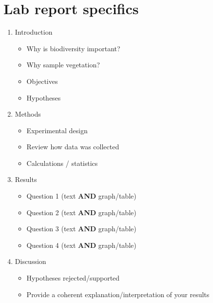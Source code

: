 \documentclass[]{book}
\providecommand{\tightlist}{%
  \setlength{\itemsep}{0pt}\setlength{\parskip}{0pt}}
\theoremstyle{definition}
\theoremstyle{definition}
\theoremstyle{definition}
\theoremstyle{remark}
\begin{document}
\pagebreak

\section{Lab report specifics}\label{lab-report-specifics-2}

\begin{enumerate}
\def\labelenumi{\arabic{enumi}.}
\tightlist
\item
  Introduction

  \begin{itemize}
  \tightlist
  \item
    Why is biodiversity important?
  \item
    Why sample vegetation?
  \item
    Objectives
  \item
    Hypotheses
  \end{itemize}
\item
  Methods

  \begin{itemize}
  \tightlist
  \item
    Experimental design
  \item
    Review how data was collected
  \item
    Calculations / statistics
  \end{itemize}
\item
  Results

  \begin{itemize}
  \tightlist
  \item
    Question 1 (text \textbf{AND} graph/table)
  \item
    Question 2 (text \textbf{AND} graph/table)
  \item
    Question 3 (text \textbf{AND} graph/table)
  \item
    Question 4 (text \textbf{AND} graph/table)
  \end{itemize}
\item
  Discussion

  \begin{itemize}
  \tightlist
  \item
    Hypotheses rejected/supported
  \item
    Provide a coherent explanation/interpretation of your results
  \end{itemize}
\end{enumerate}



\backmatter
\printindex
\end{document}
